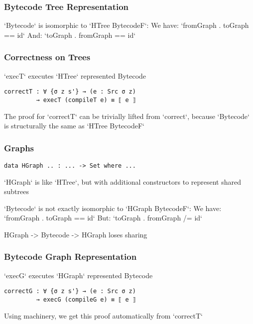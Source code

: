         \begin{frame}[fragile]
            \frametitle{Bytecode Tree Representation}
            `Bytecode` is isomorphic to `HTree BytecodeF`:
            We have: `fromGraph . toGraph == id`
            And:     `toGraph . fromGraph == id`
        \end{frame}
                
        \begin{frame}[fragile]
            \frametitle{Correctness on Trees}
            `execT` executes `HTree` represented Bytecode
            \begin{verbatim}
correctT : ∀ {σ z s'} → (e : Src σ z) 
         → execT (compileT e) ≡ ⟦ e ⟧
            \end{verbatim}
            The proof for `correctT` can be trivially lifted from `correct`,
            because `Bytecode` is structurally the same as `HTree BytecodeF`
        \end{frame}

        \begin{frame}[fragile]
            \frametitle{Graphs}
            \begin{verbatim}
data HGraph .. : ... -> Set where ...
            \end{verbatim}
            
            `HGraph` is like `HTree`, but with additional constructors to represent shared subtrees
            
            `Bytecode` is not exactly isomorphic to `HGraph BytecodeF`:
            We have: `fromGraph . toGraph == id`
            But:     `toGraph . fromGraph /= id`
            
            HGraph -> Bytecode -> HGraph loses sharing
        \end{frame}
         
         \begin{frame}[fragile]
            \frametitle{Bytecode Graph Representation}
            `execG` executes `HGraph` represented Bytecode
            \begin{verbatim}
correctG : ∀ {σ z s'} → (e : Src σ z) 
         → execG (compileG e) ≡ ⟦ e ⟧
            \end{verbatim}
            
            Using machinery, we get this proof automatically from `correctT`
        \end{frame}


